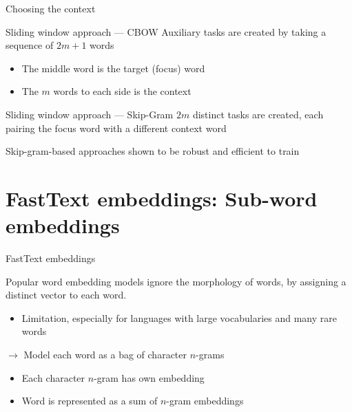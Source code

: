 \documentclass[12pt,aspectratio=169,handout]{beamer}
\begin{document}
\begin{frame}{Choosing the context}

\begin{block}{Sliding window approach --- CBOW}
Auxiliary tasks are created by taking a sequence of $2m + 1$ words
\begin{itemize}
	\item The middle word is the target (focus) word
	\item The $m$ words to each side is the context
\end{itemize}
\end{block}

\begin{block}{Sliding window approach --- Skip-Gram}
$2m$ distinct tasks are created, each pairing the focus word with a different context word
\end{block}	

Skip-gram-based approaches shown to be robust and efficient to train

\end{frame}

\section*{FastText embeddings: Sub-word embeddings}

\begin{frame}{FastText embeddings}

Popular word embedding models ignore the morphology of words, by assigning a distinct vector to each word.
\begin{itemize}
\item Limitation, especially for languages with large vocabularies and many rare words
\end{itemize}

\pause

$\to$ Model each word as a bag of character $n$-grams
\begin{itemize}
\item Each character $n$-gram has own embedding
\item Word is represented as a sum of $n$-gram embeddings	
\end{itemize}



\end{frame}
\end{document}
